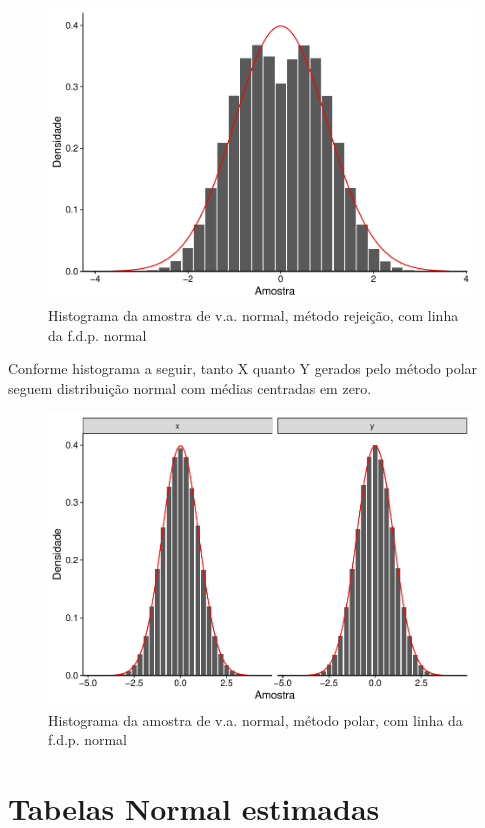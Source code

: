 \documentclass[
]{article}
\begin{document}
\begin{figure}

{\centering \includegraphics[width=0.7\linewidth]{relatorio_tp2_files/figure-latex/resultados-norm-rej-1} 

}

\caption{Histograma da amostra de v.a. normal, método rejeição, com linha da f.d.p. normal}\label{fig:resultados-norm-rej}
\end{figure}

\pagebreak

Conforme histograma a seguir, tanto X quanto Y gerados pelo método polar
seguem distribuição normal com médias centradas em zero.

\begin{figure}

{\centering \includegraphics[width=0.7\linewidth]{relatorio_tp2_files/figure-latex/resultados-norm-pol-1} 

}

\caption{Histograma da amostra de v.a. normal, método polar, com linha da f.d.p. normal}\label{fig:resultados-norm-pol}
\end{figure}

\hypertarget{tabelas-normal-estimadas}{%
\section{Tabelas Normal estimadas}\label{tabelas-normal-estimadas}}
\end{document}
